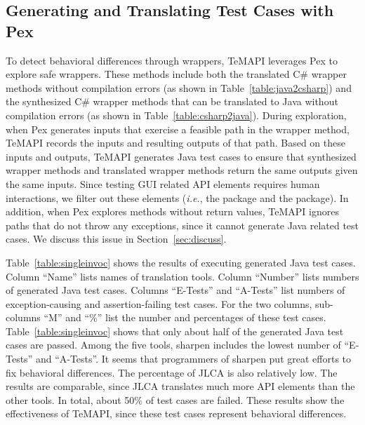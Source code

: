 \subsection{Generating and Translating Test Cases with Pex}
\label{sec:evaluation:single}


To detect behavioral differences through wrappers, TeMAPI leverages Pex to explore safe wrappers. These methods include both the translated C\# wrapper methods without compilation errors (as shown in Table~\ref{table:java2csharp}) and the synthesized C\# wrapper methods that can be translated to Java without compilation errors (as shown in Table~\ref{table:csharp2java}). During exploration, when Pex generates inputs that exercise a feasible path in the wrapper method, TeMAPI records the inputs and resulting outputs of that path. Based on these inputs and outputs, TeMAPI generates Java test cases to ensure that synthesized wrapper methods and translated wrapper methods return the same outputs given the same inputs. Since testing GUI related API elements requires human interactions, we filter out these elements (\emph{i.e.}, the  package and the  package). In addition, when Pex explores methods without return values, TeMAPI ignores paths that do not throw any exceptions, since it cannot generate Java related test cases. We discuss this issue in Section~\ref{sec:discuss}.

Table~\ref{table:singleinvoc} shows the results of executing generated Java test cases. Column ``Name'' lists names of translation tools. Column ``Number'' lists numbers of generated Java test cases. Columns ``E-Tests'' and ``A-Tests'' list numbers of exception-causing and assertion-failing test cases. For the two columns, sub-columns ``M'' and ``\%'' list the number and percentages of these test cases. Table~\ref{table:singleinvoc} shows that only about half of the generated Java test cases are passed. Among the five tools, sharpen includes the lowest number of ``E-Tests'' and ``A-Tests''. It seems that programmers of sharpen put great efforts to fix behavioral differences. The percentage of JLCA is also relatively low. The results are comparable, since JLCA translates much more API elements than the other tools. In total, about 50\% of test cases are failed. These results show the effectiveness of TeMAPI, since these test cases represent behavioral differences.


